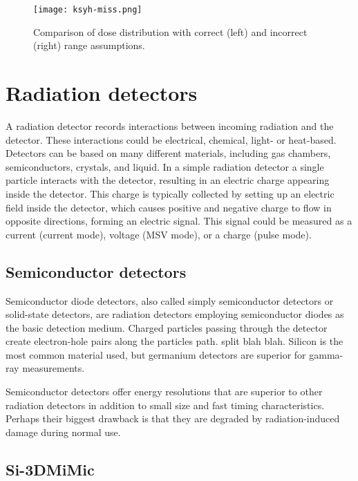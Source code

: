 \documentclass[../main/thesis.tex]{subfiles}
\begin{document}
\begin{figure}%
	\centering
	\texttt{[image: ksyh-miss.png]}
	\caption{Comparison of dose distribution with correct (left) and incorrect (right) range assumptions. \citep{ksyh-phys251}}
	\label{fig-miss}
\end{figure}

\section{Radiation detectors}
\label{t-detector}
A radiation detector records interactions between incoming radiation and the detector. These interactions could be electrical, chemical, light- or heat-based. Detectors can be based on many different materials, including gas chambers, semiconductors, crystals, and liquid. \citep[chap. 9]{Thorsteinsen} In a simple radiation detector a single particle interacts with the detector, resulting in an electric charge appearing inside the detector. This charge is typically collected by setting up an electric field inside the detector, which causes positive and negative charge to flow in opposite directions, forming an electric signal. This signal could be measured as a current (current mode), voltage (\gls{MSV} mode), or a charge (pulse mode). \citep[chap. 4]{Knoll}



\subsection{Semiconductor detectors}
\label{t-semi}
Semiconductor diode detectors, also called simply semiconductor detectors or solid-state detectors, are radiation detectors employing semiconductor diodes as the basic detection medium. Charged particles passing through the detector create electron-hole pairs along the particles path. split blah blah. Silicon is the most common material used, but germanium detectors are superior for gamma-ray measurements. 

Semiconductor detectors offer energy resolutions that are superior to other radiation detectors in addition to small size and fast timing characteristics. Perhaps their biggest drawback is that they are degraded by radiation-induced damage during normal use.  

\subsection{Si-3DMiMic}
\label{t-3d}
\end{document}
